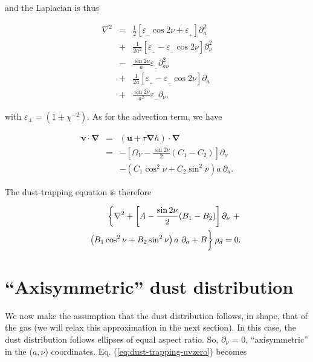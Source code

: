 \documentclass[apj]{emulateapj}
\renewcommand{\v}[1]{{\boldsymbol{#1}}} %
\def\white#1{\textcolor{white}{#1}}
\newcommand{\del}{\v{\nabla}}
\newcommand{\grad}{\del}
\newcommand{\Laplace}{\nabla^2}
\newcommand{\Eq}[1]{Eq. (\ref{#1})}
\newcommand{\eq}[1]{\Eq{#1}}
\newcommand{\beq}{\begin{equation}}
\newcommand{\eeq}{\end{equation}}
\newcommand{\beqn}{\begin{eqnarray}}
\newcommand{\eeqn}{\end{eqnarray}}
\newcommand{\epsp}{\varepsilon_{_{+}}}
\newcommand{\epsm}{\varepsilon_{_{-}}}
\begin{document}
\noindent and the Laplacian is thus 

\beqn
\Laplace{} &= &\frac{1}{2}\left[ \epsm \cos 2\nu +  \epsp\right] \partial^2_a  \nonumber \\
                &+& \frac{1}{2a^2}\left[ \epsp - \epsm \cos 2\nu\right] \partial^2_\nu \nonumber \\
                &-& \frac{\sin 2\nu}{a}\epsm \partial^2_{a\nu}   \nonumber \\
                &+& \frac{1}{2a}\left[ \epsp - \epsm \cos 2\nu\right] \partial_a \nonumber \\
                &+& \frac{\sin 2\nu}{a^2} \epsm\partial_\nu, \label{eq:laplace}
\eeqn

\noindent with $\varepsilon_{\pm} = (1 \pm \chi^{-2})$.  As for the advection term, we have 

\beqn
\v{v}\cdot\del &=& (\v{u} + \tau \grad h) \cdot \del \nonumber \\
&=& - \left[\varOmega_V - \frac{\sin2\nu}{2}  (C_1 -  C_2)\right]\partial_\nu \nonumber \\
&&- \left( C_1 \cos^2\nu   + C_2\sin^2\nu \right) a \ \partial_a. \label{eq:advection-term}
\eeqn


The dust-trapping equation is therefore 


\beqn 
&& \left\{ \Laplace{} + \left[A - \frac{\sin2\nu}{2}  (B_1 - B_2)\right]\partial_\nu \ +  \right.  \nonumber\\
&& \left. \white{\frac{1}{1}}\left( B_1 \cos^2\nu   + B_2\sin^2\nu
  \right) a \ \partial_a  + B \right\} \rho_d = 0. \label{eq:dust-trapping-uvzero}
\eeqn



\section{``Axisymmetric'' dust distribution}

We now make the assumption that the dust distribution follows, in shape, that of
the gas (we will relax this approximation in the next section). In this case, the
dust distribution follows ellipses of equal aspect ratio. So,
$\partial_\nu$ = 0, ``axisymmetric'' in the ($a,\nu$)
coordinates. \eq{eq:dust-trapping-uvzero} becomes
\end{document}
